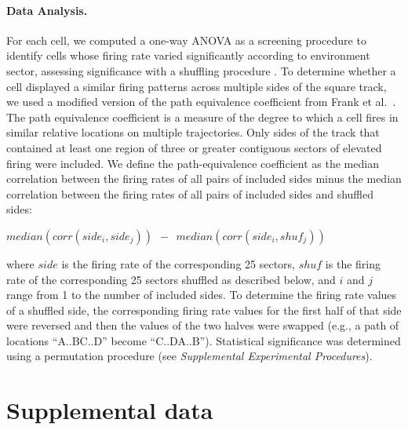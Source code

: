 \paragraph{Data Analysis.}
For each cell, we computed a one-way ANOVA as a screening procedure to identify cells whose firing rate varied significantly according to environment sector, assessing significance with a shuffling procedure \cite{EkstEtal03}. 
To determine whether a cell displayed a similar firing patterns across multiple sides of the square track, we used a modified version of the path equivalence coefficient from Frank et al.\ \citep{FranEtal00}. The path equivalence coefficient is a measure of the degree to which a cell fires in similar relative locations on multiple trajectories. Only sides of the track that contained at least one region of three or greater contiguous sectors of elevated firing were included.  We define the path-equivalence coefficient as the median correlation between the firing rates of all pairs of included sides minus the median correlation between the firing rates of all pairs of included sides and shuffled sides:

\(median(corr(side_{i},side_{j})) ~~ - ~~ median(corr(side_{i},shuf_{j}))\)

where $side$ is the firing rate of the corresponding 25 sectors, $shuf$ is the firing rate of the corresponding 25 sectors shuffled as described below, and $i$ and $j$ range from 1 to the number of included sides. To determine the firing rate values of a  shuffled side, the corresponding  firing rate values for the first half of that side were reversed and then the values of the two halves were swapped (e.g., a path of locations   ``A..BC..D''  become ``C..DA..B''). Statistical significance was determined using a permutation procedure (see \emph{Supplemental Experimental Procedures}).

\section{Supplemental data}

